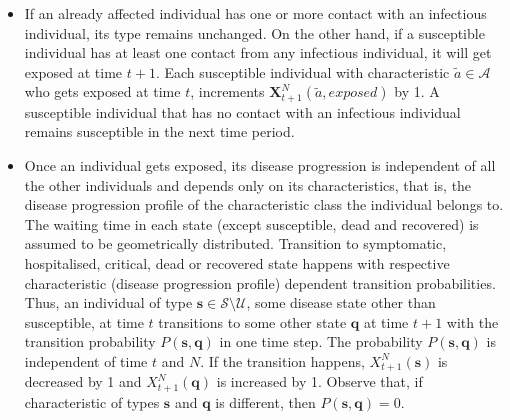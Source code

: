 \documentclass{article}
\theoremstyle{definition}
\begin{document}
\begin{itemize}
         \item
          If an already affected individual has one or more contact 
         with an infectious individual, its type remains unchanged. On the other hand, 
      if a susceptible individual has at least one contact from any infectious individual, it will get exposed at time $t+1$.
      Each susceptible individual with characteristic $\tilde{a} \in \mathcal A$ who gets exposed
      at time $t$, increments 
      ${\bm{X}_{t+1}^N}(\tilde{a},exposed)$  by 1. A susceptible individual  that has no contact with an infectious individual remains susceptible
      in the next time period.         
       \item
        Once an individual gets exposed, its disease progression is independent of all the other individuals and depends only on its characteristics, that is, the disease progression profile of the characteristic class the individual belongs to. The waiting time in each state (except susceptible, dead and recovered) is assumed to be geometrically distributed. Transition to symptomatic, hospitalised, critical, dead or recovered state happens with respective characteristic (disease progression profile) dependent transition probabilities.  Thus, an individual of type $\bm{s} \in \mathcal S \setminus \mathcal U$, some disease state other than susceptible, at time $t$ transitions to some other state $\bm{q}$ at time $t+1$ with the transition probability $P(\bm{s},\bm{q})$ in one time step. The probability $P(\bm{s},\bm{q})$ is independent of time $t$
        and $N$.  If the transition happens,  $X_{t+1}^N(\bm{s})$ is decreased by 1 and $X_{t+1}^N(\bm{q})$ is increased by 1. Observe that, if characteristic of types $\bm{s}$ and $\bm{q}$ is different, then $P(\bm{s},\bm{q}) = 0$. 
         \end{itemize}
 

 

      
       
\end{document}

